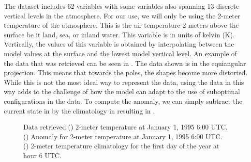The dataset includes 62 variables with some variables also spanning 13 discrete vertical levels in the atmosphere. For our use, we will only be using the 2-meter temperature of the atmosphere. This is the air temperature 2 meters above the surface be it land, sea, or inland water. This variable is in units of kelvin (K). Vertically, the values of this variable is obtained by interpolating between the model values at the surface and the lowest model vertical level. An example of the data that was retrieved can be seen in . The data shown is in the equiangular projection. This means that towards the poles, the shapes become more distorted. While this is not the most ideal way to represent the data, using the data in this way adds to the challenge of how the model can adapt to the use of suboptimal configurations in the data. To compute the anomaly, we can simply subtract the current state in  by the climatology in  resulting in .
\begin{figure}[H]
  \centering
  \begin{subfigure}{\linewidth}
    \begin{adjustbox}{width=\linewidth}
      
    \end{adjustbox}
    \caption{}\label{fig:wb2_train_data}
  \end{subfigure}
  \begin{subfigure}{\linewidth}
    \begin{adjustbox}{width=\linewidth}
      
    \end{adjustbox}
    \caption{}\label{fig:wb2_clim_data}
  \end{subfigure}
  \begin{subfigure}{\linewidth}
    \begin{adjustbox}{width=\linewidth}
      
    \end{adjustbox}
    \caption{}\label{fig:wb2_train_anomaly}
  \end{subfigure}
  \caption{Data retrieved:() 2-meter temperature at January 1, 1995 6:00 UTC\@. () Anomaly for 2-meter temperature at January 1, 1995 6:00 UTC\@. () 2-meter temperature climatology for the first day of the year at hour 6 UTC\@.}\label{fig:wb2_data}
\end{figure}

